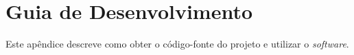 \apendice
\chapter{Guia de Desenvolvimento} %

Este apêndice descreve como obter o código-fonte do projeto e utilizar o \emph{software}.

